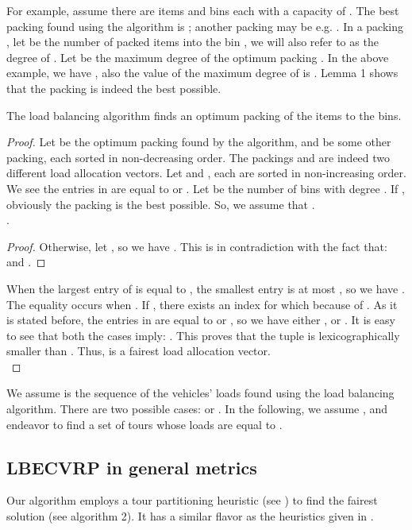 \indent For example, assume there are  items and  bins each with a capacity of . The best packing found using the algorithm is ; another packing  may be e.g. . In a packing , let  be the number of packed items into the bin , we will also refer to  as the degree of . Let  be the maximum degree of the optimum packing . In the above example, we have , also the value of the maximum degree of  is . Lemma 1 shows that the packing  is indeed the best possible. 
\begin{lemma}The load balancing algorithm finds an optimum packing of the items to the bins. 
\end{lemma}
\begin{proof} Let   be the optimum packing found by the algorithm, and  be some other packing, each sorted in non-decreasing order. The packings  and  are indeed two different load allocation vectors. Let  and , each are sorted in non-increasing order. We see the entries in  are equal to  or . Let  be the number of bins with degree . If , obviously the packing  is the best possible. So, we assume that .\\

\noindent  .
\begin{proof}Otherwise, let , so we have . This is in contradiction with the fact that:  and .
\end{proof}

\indent When the largest entry  of  is equal to , the smallest entry  is at most , so we have . The equality   occurs when . If , there exists an index  for which  because of . As it is stated before, the entries in  are equal to  or , so we have either , or . It is easy to see that both the cases imply: . This proves that the tuple  is lexicographically smaller than . Thus,  is a fairest load allocation vector.\\
 
\end{proof}

\indent  We assume   is the sequence of the vehicles' loads found using the load balancing algorithm. There are two possible cases:  or . In the following, we assume , and endeavor to find a set of tours whose loads are equal to . 
\subsection{LBECVRP in general metrics}
\noindent Our algorithm employs a tour partitioning heuristic (see \cite{Beasley}) to find the fairest solution (see algorithm 2). It has a similar flavor as the heuristics given in \cite{Altinkemer1990,Altinkemer1987,Haimovich1985}.  \\

